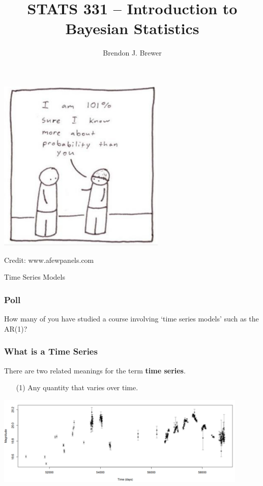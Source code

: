\documentclass{beamer}
\author{Brendon J. Brewer}
\title{STATS 331 -- Introduction to Bayesian Statistics}
\institute{The University of Auckland}
\date{}
\begin{document}
\frame{\titlepage}

\begin{frame}
\begin{center}
\includegraphics[width=0.6\textwidth]{images/101.png}

Credit: www.afewpanels.com
\end{center}

\end{frame}


\begin{frame}
\Large

\begin{center}
Time Series Models
\end{center}
\end{frame}

\begin{frame}
\frametitle{Poll}
How many of you have studied a course involving `time series models'
such as the AR(1)?
\end{frame}


\begin{frame}
\frametitle{What is a Time Series}
There are two related meanings for the term {\bf time series}.

\begin{itemize}
\item [(1)] Any quantity that varies over time.
\end{itemize}

\begin{center}
\includegraphics[width=0.9\textwidth]{images/time_series.png}
\end{center}

\end{frame}
\end{document}
